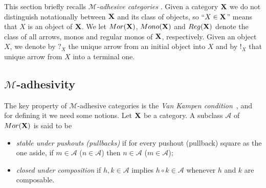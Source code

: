 \documentclass[a4paper,UKenglish,cleveref,pdftex,thm-restate,numberwithinsect]{lipics-v2021}
\def\X{\textbf {\textup{X}}}
\newcommand{\mor}{\mathsf{Mor}}
\newcommand{\mon}{\mathsf{Mono}}
\newcommand{\reg}{\mathsf{Reg}}
\begin{document}
This  section briefly recalls \emph{$\mathcal{M}$-adhesive categories} \cite{azzi2019essence,ehrig2012,ehrig2014adhesive,lack2005adhesive,heindel2009category}. 
%
Given a category $\X$ we do not distinguish notationally between $\X$ and its class of objects, so
``$X\in \X$'' means that $X$ is an object of $\X$. We let $\mor(\X)$, $\mon(\X)$ and $\reg(\X)$ denote the class of all arrows, monos and regular monos of $\X$, respectively.  Given an object $X$, we  denote by $?_X$ the unique arrow from an initial object into $X$ and by $!_X$ that  unique arrow from $X$ into a terminal one.

\subsection{$\mathcal{M}$-adhesivity}\label{subsec:ade}
The key property of $\mathcal{M}$-adhesive categories is the \emph{Van Kampen condition}~\cite{brown1997van,johnstone2007quasitoposes,lack2005adhesive},
%
and for defining it we need some notions.
Let  $\X$ be a category. A subclass $\mathcal{A}$ of $\mor(\X)$ is said to be

\parbox{11cm}{\begin{itemize}
	\item		\emph{stable under pushouts (pullbacks)} if for every pushout (pullback) square as the one aside, if $m \in \mathcal{A}$ ($n\in \mathcal{A}$) then $n \in \mathcal{A}$ ($m \in \mathcal{A}$);
		\item \emph{closed under composition} if $h, k\in \mathcal{A}$ implies $h\circ k\in \mathcal{A}$ whenever $h$ and $k$ are composable.
\end{itemize}}\hfill
\parbox{1cm}{
}
\end{document}
